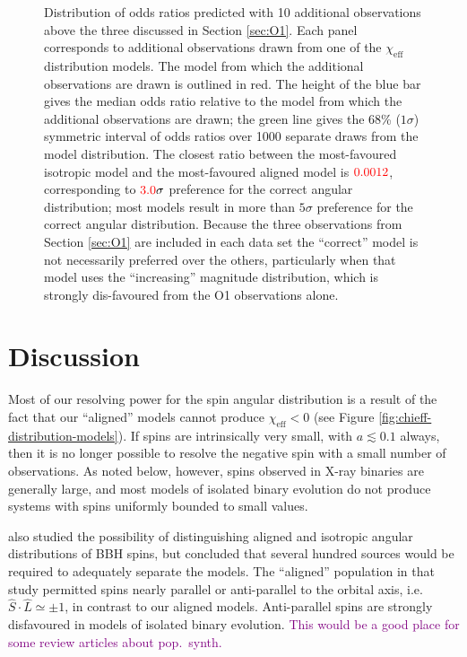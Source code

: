 \documentclass[modern,linenumbers]{aastex61}
\newcommand{\chieff}{\chi_\mathrm{eff}}
\newcommand{\checkme}[1]{\textcolor{red}{#1}}
\newcommand{\OTwoSigmaIsoAlignedMin}{\checkme{3.0}}
\newcommand{\OTwoOddsIsoAlignedMin}{\checkme{0.0012}}
\newcommand{\ilya}[1]{\textcolor{purple}{#1}}
\begin{document}
\begin{figure}
  \caption{\label{fig:O2-predictions} Distribution of odds ratios
    predicted with 10 additional observations above the three
    discussed in Section \ref{sec:O1}.  Each panel corresponds to
    additional observations drawn from one of the $\chieff$
    distribution models.  The model from which the additional
    observations are drawn is outlined in red.  The height of the blue
    bar gives the median odds ratio relative to the model from which
    the additional observations are drawn; the green line gives the
    68\% ($1 \sigma$) symmetric interval of odds ratios over 1000
    separate draws from the model distribution.  The closest ratio
    between the most-favoured isotropic model and the most-favoured
    aligned model is $\OTwoOddsIsoAlignedMin$, corresponding to
    $\OTwoSigmaIsoAlignedMin\sigma$ preference for the correct angular
    distribution; most models result in more than $5\sigma$ preference
    for the correct angular distribution.  Because the three
    observations from Section \ref{sec:O1} are included in each data
    set the ``correct'' model is not necessarily preferred over the
    others, particularly when that model uses the ``increasing''
    magnitude distribution, which is strongly dis-favoured from the O1
    observations alone.}
\end{figure}

\section{Discussion}

Most of our resolving power for the spin angular distribution is a
result of the fact that our ``aligned'' models cannot produce
$\chieff < 0$ (see Figure \ref{fig:chieff-distribution-models}).  If
spins are intrinsically very small, with $a \lesssim 0.1$ always, then
it is no longer possible to resolve the negative spin with a small
number of observations.  As noted below, however, spins observed in
X-ray binaries are generally large, and most models of isolated binary
evolution do not produce systems with spins uniformly bounded to small
values.

\citet{2017CQGra..34cLT01V} also studied the possibility of
distinguishing aligned and isotropic angular distributions of \ac{BBH}
spins, but concluded that several hundred sources would be required to
adequately separate the models.  The ``aligned'' population in that
study permitted spins nearly parallel or anti-parallel to the orbital
axis, i.e.\ $\hat{S}\cdot \hat{L} \simeq \pm 1$, in contrast to our
aligned models.  Anti-parallel spins are strongly disfavoured in
models of isolated binary evolution.  \ilya{This would be a good place
  for some review articles about pop.\ synth.}
\end{document}
